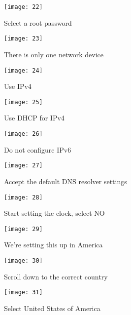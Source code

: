 \begin{figure}
  \centering
\texttt{[image: 22]}
  \caption{Select a root password}
  \label{fig:utm-fbsd-rootpw}
\end{figure}

\begin{figure}
  \centering
\texttt{[image: 23]}
  \caption{There is only one network device}
  \label{fig:utm-fbsd-netdev}
\end{figure}

\begin{figure}
  \centering
\texttt{[image: 24]}
  \caption{Use IPv4}
  \label{fig:utm-fbsd-ipv4}
\end{figure}

\begin{figure}
  \centering
\texttt{[image: 25]}
  \caption{Use DHCP for IPv4}
  \label{fig:utm-fbsd-dhcp}
\end{figure}

\begin{figure}
  \centering
\texttt{[image: 26]}
  \caption{Do not configure IPv6}
  \label{fig:utm-fbsd-ipv6}
\end{figure}

\begin{figure}
  \centering
\texttt{[image: 27]}
  \caption{Accept the default DNS resolver settings}
  \label{fig:utm-fbsd-dns}
\end{figure}

\begin{figure}
  \centering
\texttt{[image: 28]}
  \caption{Start setting the clock, select NO}
  \label{fig:utm-fbsd-cmos}
\end{figure}

\begin{figure}
  \centering
\texttt{[image: 29]}
  \caption{We're setting this up in America}
  \label{fig:utm-fbsd-america}
\end{figure}

\begin{figure}
  \centering
\texttt{[image: 30]}
  \caption{Scroll down to the correct country}
  \label{fig:utm-fbsd-anguilla}
\end{figure}

\begin{figure}
  \centering
\texttt{[image: 31]}
  \caption{Select United States of America}
  \label{fig:utm-fbsd-usa}
\end{figure}

